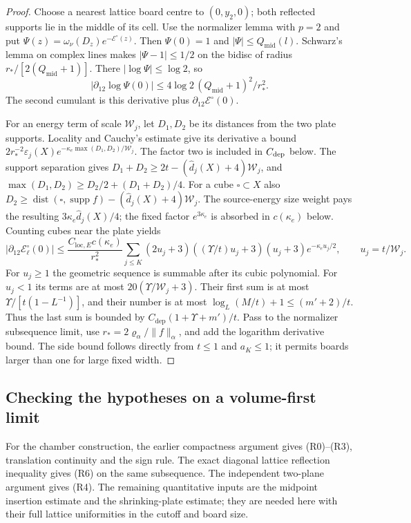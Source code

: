 \documentclass[11pt,letterpaper,reqno]{amsart}
\theoremstyle{definition}
\theoremstyle{remark}
\begin{document}
\begin{proof}
Choose a nearest lattice board centre to
$(0,y_2,0)$; both reflected supports lie
in the middle of its cell.  Use the
normalizer lemma with $p=2$ and put
$\Psi(z)=\omega_\nu(D_z)e^{-\mathcal E^\circ(z)}$.
Then $\Psi(0)=1$ and $|\Psi|\le Q_{\mathrm{mid}}(l)$.
Schwarz's lemma on complex lines makes
$|\Psi-1|\le1/2$ on the bidisc of radius
$r_*/[2(Q_{\mathrm{mid}}+1)]$.
There $|\log\Psi|\le\log2$, so
\[
 |\partial_{12}\log\Psi(0)|
 \le4\log2\,(Q_{\mathrm{mid}}+1)^2/r_*^2.
\]
The second cumulant is this derivative
plus $\partial_{12}\mathcal E^\circ(0)$.

For an energy term of scale $\mathscr W_j$,
let $D_1,D_2$ be its distances from the
two plate supports.  Locality and Cauchy's
estimate give its derivative a bound
$2r_*^{-2}\varepsilon_j(X)
e^{-\kappa_e\max(D_1,D_2)/\mathscr W_j}$.
The factor two is included in $C_{\rm dep}$ below.
The support separation gives
$D_1+D_2\ge2t-(\hat d_j(X)+4)\mathscr W_j$,
and
$\max(D_1,D_2)\ge D_2/2+(D_1+D_2)/4$.
For a cube $\square\subset X$ also
$D_2\ge\operatorname{dist}(\square,
\operatorname{supp}f)-(\hat d_j(X)+4)\mathscr W_j$.
The source-energy size weight pays the
resulting $3\kappa_e\hat d_j(X)/4$; the fixed factor
$e^{3\kappa_e}$ is absorbed in $c(\kappa_e)$ below.
Counting cubes near the plate yields
\[
 |\partial_{12}\mathcal E_\ell^\circ(0)|
 \le\frac{C_{\mathrm{loc},E}c(\kappa_e)}{r_*^2}
 \sum_{j\le K}(2u_j+3)
       ((\Upsilon/t)u_j+3)(u_j+3)
                         e^{-\kappa_eu_j/2},
 \qquad u_j=t/\mathscr W_j.
\]
For $u_j\ge1$ the geometric sequence is
summable after its cubic polynomial.
For $u_j<1$ its terms are at most
$20(\Upsilon/\mathscr W_j+3)$.
Their first sum is at most
$\Upsilon/[t(1-L^{-1})]$, and their number
is at most $\log_L(M/t)+1\le(m'+2)/t$.
Thus the last sum is bounded by
$C_{\mathrm{dep}}(1+\Upsilon+m')/t$.
Pass to the normalizer subsequence limit,
use $r_*=2\varrho_\alpha/\|f\|_\alpha$,
and add the logarithm derivative bound.
The side bound follows directly from
$t\le1$ and $a_K\le1$; it permits boards
larger than one for large fixed width.
\end{proof}

\subsection{Checking the hypotheses on a volume-first limit}

For the chamber construction, the earlier compactness
argument gives (R0)--(R3), translation continuity and
the sign rule.  The exact diagonal lattice reflection
inequality gives (R6) on the same subsequence.  The
independent two-plane argument gives (R4).  The
remaining quantitative inputs are the midpoint
insertion estimate and the shrinking-plate estimate;
they are needed here with their full lattice
uniformities in the cutoff and board size.
\end{document}
